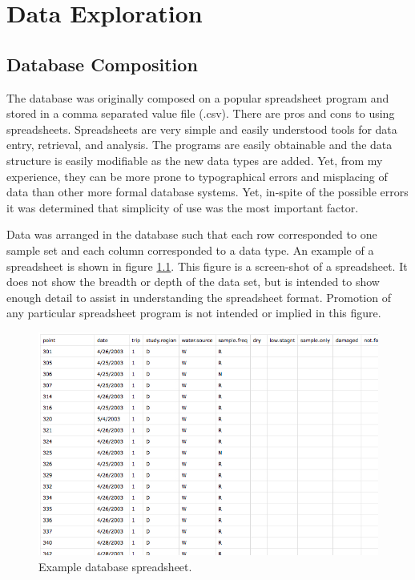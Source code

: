 \chapter{Data Exploration}
\label{chap:data exploration}

\section{Database Composition}
\label{sec:database composition}

The database was originally composed on a popular spreadsheet program and stored in a comma separated value file (.csv).  There are pros and cons to using spreadsheets.   Spreadsheets are very simple and easily understood tools for data entry, retrieval, and analysis.   The programs are easily obtainable and the data structure is easily modifiable as the new data types are added.  Yet, from my experience, they can be more prone to typographical errors and misplacing of data than other more formal database systems.  Yet, in-spite of the possible errors it was determined that simplicity of use was the most important factor.

Data was arranged in the database such that each row corresponded to one sample set and each column corresponded to a data type.  An example of a spreadsheet is shown in figure \ref{fig:spreadsheetExample}.  This figure is a screen-shot of a spreadsheet.  It does not show the breadth or depth of the data set, but is intended to show enough detail to assist in understanding the spreadsheet format.  Promotion of any particular spreadsheet program is not intended or implied in this figure.

\begin{figure}
	\centering
	\includegraphics[width=6in]{Figures/Photo/ExampleDatabaseSpreadsheet}
	\caption[Example database spreadsheet.]{Example database spreadsheet.}
	\label{fig:spreadsheetExample}
\end{figure}	

